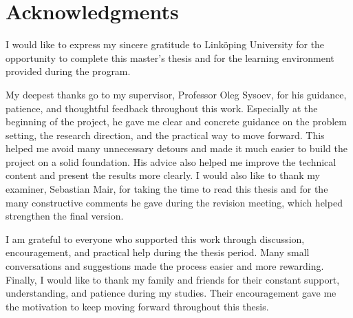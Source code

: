 \chapter*{Acknowledgments}
\noindent I would like to express my sincere gratitude to Link{\"o}ping University for the opportunity to complete this master's thesis and for the learning environment provided during the program.

\noindent My deepest thanks go to my supervisor, Professor Oleg Sysoev, for his guidance, patience, and thoughtful feedback throughout this work. Especially at the beginning of the project, he gave me clear and concrete guidance on the problem setting, the research direction, and the practical way to move forward. This helped me avoid many unnecessary detours and made it much easier to build the project on a solid foundation. His advice also helped me improve the technical content and present the results more clearly. I would also like to thank my examiner, Sebastian Mair, for taking the time to read this thesis and for the many constructive comments he gave during the revision meeting, which helped strengthen the final version.

\noindent I am grateful to everyone who supported this work through discussion, encouragement, and practical help during the thesis period. Many small conversations and suggestions made the process easier and more rewarding. Finally, I would like to thank my family and friends for their constant support, understanding, and patience during my studies. Their encouragement gave me the motivation to keep moving forward throughout this thesis.
